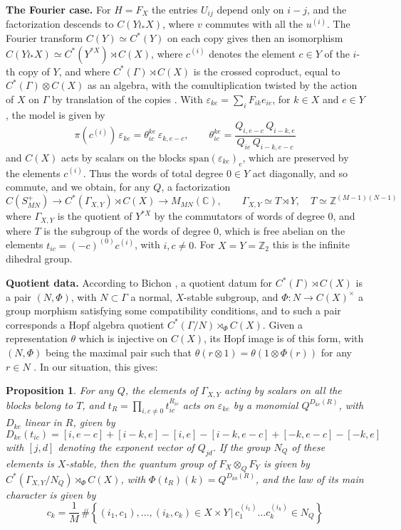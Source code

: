 \documentclass[11pt]{amsart}
\newtheorem{proposition}[theorem]{Proposition}
\begin{document}
\noindent\textbf{The Fourier case.} For $H=F_X$ the entries $U_{ij}$ depend only on $i-j$, and the factorization descends to $C(Y\wr_*X)$, where $v$ commutes with all the $u^{(i)}$. The Fourier transform $C(Y)\simeq C^*(Y)$ on each copy gives then an isomorphism $C(Y\wr_*X)\simeq C^*(Y^{*X})\rtimes C(X)$, where $c^{(i)}$ denotes the element $c\in Y$ of the $i$-th copy of $Y$, and where $C^*(\Gamma)\rtimes C(X)$ is the crossed coproduct, equal to $C^*(\Gamma)\otimes C(X)$ as an algebra, with the comultiplication twisted by the action of $X$ on $\Gamma$ by translation of the copies \cite[Section 3]{bb3}. With $\varepsilon_{ke}=\sum_iF_{ik}e_{ie}$, for $k\in X$ and $e\in Y$, the model is given by
$$\pi(c^{(i)})\,\varepsilon_{ke}=\theta_{ic}^{ke}\,\varepsilon_{k,e-c},\qquad\theta_{ic}^{ke}=\frac{Q_{i,e-c}\,Q_{i-k,e}}{Q_{ie}\,Q_{i-k,e-c}}$$
and $C(X)$ acts by scalars on the blocks $\mathrm{span}(\varepsilon_{ke})_e$, which are preserved by the elements $c^{(i)}$. Thus the words of total degree $0\in Y$ act diagonally, and so commute, and we obtain, for any $Q$, a factorization \cite[Theorem 3.10, Proposition 4.2]{bb3}
$$C(S_{MN}^+)\to C^*(\Gamma_{X,Y})\rtimes C(X)\to M_{MN}(\mathbb C),\qquad\Gamma_{X,Y}\simeq T\rtimes Y,\quad T\simeq\mathbb Z^{(M-1)(N-1)}$$
where $\Gamma_{X,Y}$ is the quotient of $Y^{*X}$ by the commutators of words of degree 0, and where $T$ is the subgroup of the words of degree 0, which is free abelian on the elements $t_{ic}=(-c)^{(0)}c^{(i)}$, with $i,c\neq0$. For $X=Y=\mathbb Z_2$ this is the infinite dihedral group.

\medskip

\noindent\textbf{Quotient data.} According to Bichon \cite{bic}, a quotient datum for $C^*(\Gamma)\rtimes C(X)$ is a pair $(N,\Phi)$, with $N\subset\Gamma$ a normal, $X$-stable subgroup, and $\Phi:N\to C(X)^\times$ a group morphism satisfying some compatibility conditions, and to such a pair corresponds a Hopf algebra quotient $C^*(\Gamma/N)\rtimes_\Phi C(X)$. Given a representation $\theta$ which is injective on $C(X)$, its Hopf image is of this form, with $(N,\Phi)$ being the maximal pair such that $\theta(r\otimes1)=\theta(1\otimes\Phi(r))$ for any $r\in N$ \cite[Proposition 4.1]{bic}. In our situation, this gives:

\begin{proposition}\label{prop:nq}
For any $Q$, the elements of $\Gamma_{X,Y}$ acting by scalars on all the blocks belong to $T$, and $t_R=\prod_{i,c\neq0}t_{ic}^{R_{ic}}$ acts on $\varepsilon_{ke}$ by a monomial $Q^{D_{ke}(R)}$, with $D_{ke}$ linear in $R$, given by
$$D_{ke}(t_{ic})=[i,e-c]+[i-k,e]-[i,e]-[i-k,e-c]+[-k,e-c]-[-k,e]$$
with $[j,d]$ denoting the exponent vector of $Q_{jd}$. If the group $N_Q$ of these elements is $X$-stable, then the quantum group of $F_X\otimes_QF_Y$ is given by $C^*(\Gamma_{X,Y}/N_Q)\rtimes_\Phi C(X)$, with $\Phi(t_R)(k)=Q^{D_{k0}(R)}$, and the law of its main character is given by
$$c_k=\frac{1}{M}\,\#\left\{(i_1,c_1),\ldots,(i_k,c_k)\in X\times Y\,\Big|\,c_1^{(i_1)}\ldots c_k^{(i_k)}\in N_Q\right\}$$
\end{proposition}
\end{document}
